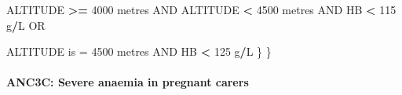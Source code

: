 \documentclass[12pt,a4paper]{article}
\newenvironment{Shaded}{\begin{snugshade}}{\end{snugshade}}
\newcommand{\DecValTok}[1]{\textcolor[rgb]{0.00,0.00,0.81}{#1}}
\newcommand{\NormalTok}[1]{#1}
\newcommand{\OperatorTok}[1]{\textcolor[rgb]{0.81,0.36,0.00}{\textbf{#1}}}
\newcommand{\StringTok}[1]{\textcolor[rgb]{0.31,0.60,0.02}{#1}}
\let\oldparagraph\paragraph
\renewcommand{\paragraph}[1]{\oldparagraph{#1}\mbox{}}
\begin{document}
\begin{Shaded}
\begin{Highlighting}[]
\NormalTok{        ALTITUDE }\OperatorTok{>=}\StringTok{ }\DecValTok{4000}\NormalTok{ metres AND ALTITUDE }\OperatorTok{<}\StringTok{ }\DecValTok{4500}\NormalTok{ metres AND HB }\OperatorTok{<}\StringTok{ }\DecValTok{115}\NormalTok{ g}\OperatorTok{/}\NormalTok{L OR}

\NormalTok{        ALTITUDE is =}\StringTok{ }\DecValTok{4500}\NormalTok{ metres AND HB }\OperatorTok{<}\StringTok{ }\DecValTok{125}\NormalTok{ g}\OperatorTok{/}\NormalTok{L}
\NormalTok{      \}}
\NormalTok{  \}   }
\end{Highlighting}
\end{Shaded}

\newpage

\hypertarget{anc3c-severe-anaemia-in-pregnant-carers}{%
\paragraph{ANC3C: Severe anaemia in pregnant carers}\label{anc3c-severe-anaemia-in-pregnant-carers}}
\end{document}
